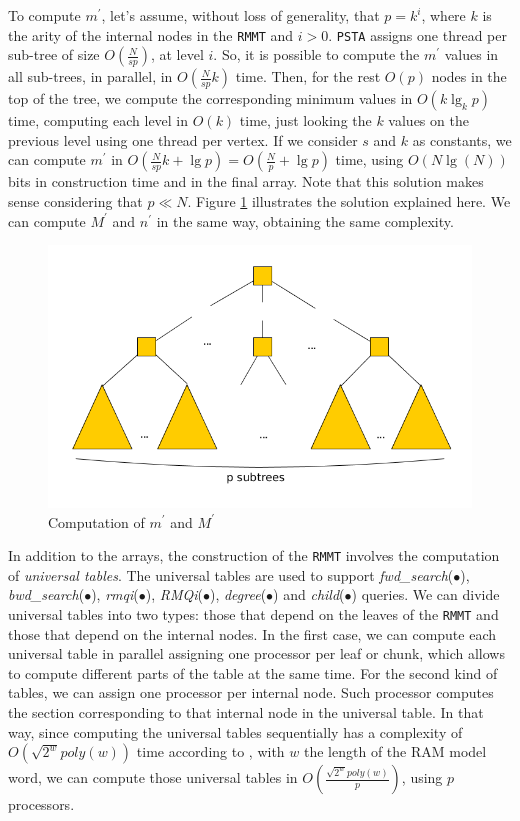 To compute $m^{\prime}$, let's assume, without loss of generality,
that $p = k^{i}$, where $k$ is the arity
of the internal nodes in the {\tt RMMT} and $i > 0$. {\tt PSTA}
assigns one thread per sub-tree of size $O(\frac{N}{sp})$, at level
$i$. So, it is possible to compute the $m^{\prime}$ values in all
sub-trees, in parallel, in $O(\frac{N}{sp}k)$ time. Then, for the
rest $O(p)$ nodes in the top of the tree, we compute the corresponding
minimum values in $O(k\lg_{k} p)$ time, computing each level in $O(k)$
time, just looking the $k$ values on the previous level using one
thread per vertex. If we consider $s$ and $k$ as constants, we can compute
$m^{\prime}$ in
$O(\frac{N}{sp}k + \lg p) = O(\frac{N}{p}+\lg p)$ time,
using $O(N\lg(N))$ bits in construction time and in the
final array. Note that this solution makes sense considering that
$p\ll N$. Figure \ref{fig:min-max-array} illustrates the solution
explained here. We can compute $M^{\prime}$ and $n^{\prime}$ in the
same way, obtaining the same complexity.

\begin{figure}[ht]
  \centering
  \includegraphics[scale=0.28]{./images/Min-Max-array.png}
  \caption{Computation of $m^{\prime}$ and $M^{\prime}$}
  \label{fig:min-max-array} 
\end{figure}

In addition to the arrays, the construction of the {\tt RMMT} involves
the computation of \emph{universal tables}. The universal tables are
used to support \emph{fwd\_search}($\bullet$),
\emph{bwd\_search}($\bullet$), \emph{rmqi}($\bullet$),
\emph{RMQi}($\bullet$), \emph{degree}($\bullet$) and
\emph{child}($\bullet$) queries. We can divide
universal tables into two types: those that depend on the leaves of
the {\tt RMMT} and those that depend on the internal nodes. In the
first case, we can compute each universal table in parallel assigning
one processor per leaf or chunk, which allows to compute different
parts of the table at the same time. For the second kind of tables, we
can assign one processor per internal node. Such processor computes
the section corresponding to that internal node in the universal
table. In that way, since computing the universal tables sequentially
has a complexity of $O(\sqrt{2^{w}}poly(w))$ time according to
\cite{Navarro:2014:FFS:2620785.2601073}, with $w$ the length of the RAM model word, we can compute those
universal tables in $\displaystyle O(\frac{\sqrt{2^{w}}poly(w)}{p})$,
using $p$ processors.

